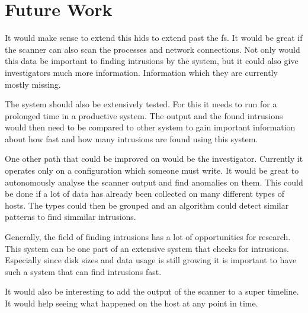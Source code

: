 \section{Future Work}
\label{sec:future:work}

It would make sense to extend this \gls{hids} to extend past the \gls{fs}. It would be great if the scanner can also scan the processes and network connections. Not only would this data be important to finding intrusions by the system, but it could also give investigators much more information. Information which they are currently mostly missing.

The system should also be extensively tested. For this it needs to run for a prolonged time in a productive system. The output and the found intrusions would then need to be compared to other system to gain important information about how fast and how many intrusions are found using this system. 

One other path that could be improved on would be the investigator. Currently it operates only on a configuration which someone must write. It would be great to autonomously analyse the scanner output and find anomalies on them. This could be done if a lot of data has already been collected on many different types of hosts. The types could then be grouped and an algorithm could detect similar patterns to find simmilar intrusions. 

Generally, the field of finding intrusions has a lot of opportunities for research. This system can be one part of an extensive system that checks for intrusions. Especially since disk sizes and data usage is still growing it is important to have such a system that can find intrusions fast.

It would also be interesting to add the output of the scanner to a super timeline. It would help seeing what happened on the host at any point in time. 
